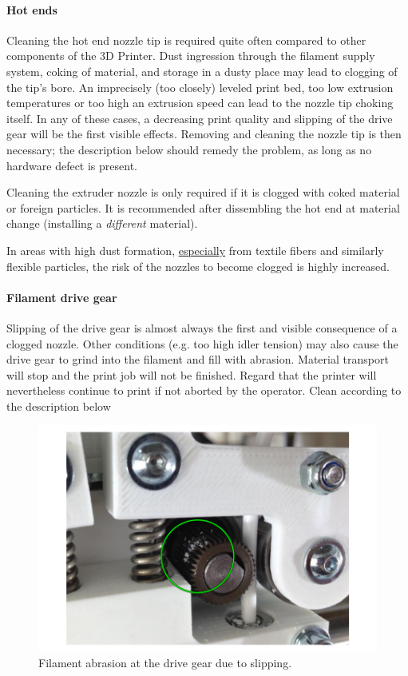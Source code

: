 \paragraph{Hot ends}

Cleaning the hot end nozzle tip is required quite often compared to other components of the 3D Printer. Dust ingression through the filament supply system, coking of material, and storage in a dusty place may lead to clogging of the tip's bore.
An imprecisely (too closely) leveled print bed, too low extrusion temperatures or too high an extrusion speed can lead to the nozzle tip choking itself.
In any of these cases, a decreasing print quality and slipping of the drive gear will be the first visible effects. Removing and cleaning the nozzle tip is then necessary; the description below should remedy the problem, as long as no hardware defect is present.

Cleaning the extruder nozzle is only required if it is clogged with coked material or foreign particles. It is recommended after dissembling the hot end at material change (installing a \emph{different} material). 

\begin{info}
  In areas with high dust formation, \underline{especially} from textile fibers and similarly flexible particles, the risk of the nozzles to become clogged is highly increased.
\end{info}

\paragraph{Filament drive gear}

Slipping of the drive gear is almost always the first and visible consequence of a clogged nozzle.
Other conditions (e.g. too high idler tension) may also cause the drive gear to grind into the filament and fill with abrasion. Material transport will stop and the print job will not be finished.
Regard that the printer will nevertheless continue to print if not aborted by the operator.
Clean according to the description below

\begin{figure}[H]
  \centering
  \includegraphics[width=.7\linewidth]{./img/mtc_cleangeardrive.png}
  \caption{Filament abrasion at the drive gear due to slipping.}
\end{figure}

